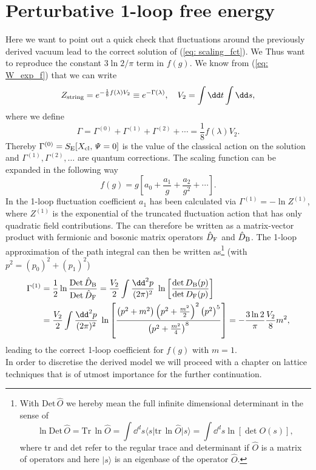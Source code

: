 \section{Perturbative 1-loop free energy}
Here we want to point out a quick check that fluctuations around the previously derived vacuum lead to the correct solution of (\ref{eq: scaling_fct}). We Thus want to reproduce the constant $3\ln 2/\pi$ term in $f(g)$. We know from (\ref{eq: W_exp_f}) that we can write
%
%
\begin{equation}
Z_{\rm string} = e^{-\frac{1}{8}f(\lambda)V_{2}} \equiv e^{-\Gamma(\lambda)}, \quad V_{2}=\int \dd t \int \dd s,
\end{equation}
%
%
where we define
%
%
\begin{equation}
\Gamma = \Gamma^{(0)} + \Gamma^{(1)}+\Gamma^{(2)}+\cdots = \frac{1}{8}f(\lambda)V_{2}.
\end{equation}
%
%
Thereby $\Gamma^{(0)}=S_{\rm E}[X_{\rm cl},\mathit{\Psi}=0]$ is the value of the classical action on the solution and $\Gamma^{(1)},\Gamma^{(2)},\ldots$ are quantum corrections. The scaling function can be expanded in the following way
%
%
\begin{equation}
f(g) = g \left[ a_{0} + \frac{a_{1}}{g} + \frac{a_{2}}{g^{2}} + \cdots \right].
\end{equation}
%
%
In \cite{Giombi:2009gd} the 1-loop fluctuation coefficient $a_{1}$ has been calculated via $\Gamma^{(1)}=-\ln Z^{(1)}$, where $Z^{(1)}$ is the exponential of the truncated fluctuation action that has only quadratic field contributions. The  can therefore be written as a matrix-vector product with fermionic and bosonic matrix operators $\hat{D}_{\rm F}$ and $\hat{D}_{\rm B}$. The 1-loop approximation of the path integral can then be written as\footnote{With $\text{Det}\,\hat{O}$ we hereby mean the full infinite dimensional determinant in the sense of
\begin{equation*}
\ln \text{Det}\,\hat{O} = \text{Tr}\,\ln \hat{O} = \int \dd^{d}s \langle s\vert \text{tr}\,\ln\hat{O} \vert s \rangle
=\int \dd^{d}s \ln[\det O(s) ] ,
\end{equation*}
where tr and det refer to the regular trace and determinant if $\hat{O}$ is a matrix of operators and here $\vert s \rangle$ is an eigenbase of the operator $\hat{O}$.} (with $p^{2} = (p_{0})^{2}+(p_{1})^{2}$)
%
%
\begin{align}
\Gamma^{(1)} &= \frac{1}{2} \ln \frac{\text{Det}\, \hat{D}_{\rm B}}{\text{Det}\,\hat{D}_{\rm F}}
=  \frac{V_{2}}{2} \int \frac{\dd^{2}p}{(2\pi)^{2}} \; \ln \left[\frac{\det D_{\rm B}(p)}{\det D_{\rm F}(p)} \right]
\label{eq: 1_loop}      \\
%
%
&= \frac{V_{2}}{2} \int \frac{\dd^{2}p}{(2\pi)^{2}} \; \ln \left[ \frac{\left(p^{2} +m^{2}\right) \left( p^{2} +\frac{m^{2}}{2}\right)^{2} \left(p^{2}\right)^{5}}{\left( p^{2} + \frac{m^{2}}{4}\right)^{8}} \right]
=-\frac{3 \ln 2}{\pi} \frac{V_{2}}{8}m^{2},   \notag
\end{align}
%
%
leading to the correct 1-loop coefficient for $f(g)$ with $m=1$.\\
In order to discretise the derived model we will proceed with a chapter on lattice techniques that is of utmost importance for the further continuation.
